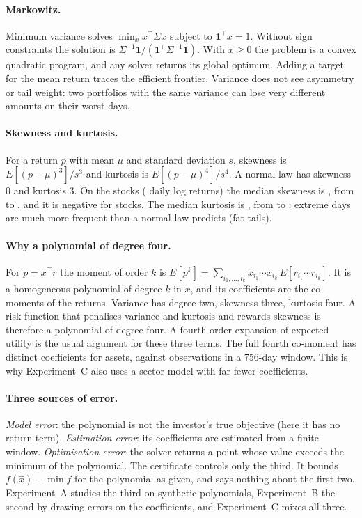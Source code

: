 \documentclass[11pt,a4paper]{article}
\begin{document}
\paragraph{Markowitz.}
Minimum variance solves $\min_x x^\top\Sigma x$ subject to $\mathbf 1^\top x=1$.
Without sign constraints the solution is $\Sigma^{-1}\mathbf 1/(\mathbf 1^\top\Sigma^{-1}\mathbf 1)$.
With $x\ge0$ the problem is a convex quadratic program, and any solver returns its global optimum.
Adding a target for the mean return traces the efficient frontier.
Variance does not see asymmetry or tail weight: two portfolios with the same variance can lose very different amounts on their worst days.

\paragraph{Skewness and kurtosis.}
For a return $p$ with mean $\mu$ and standard deviation $s$, skewness is $E[(p-\mu)^3]/s^3$ and kurtosis is $E[(p-\mu)^4]/s^4$.
A normal law has skewness 0 and kurtosis 3.
On the \uN{} stocks (\uReturns{} daily log returns) the median skewness is \uSkewMed{}, from \uSkewMin{} to \uSkewMax{}, and it is negative for \uSkewNeg{} stocks.
The median kurtosis is \uKurtMed{}, from \uKurtMin{} to \uKurtMax{}: extreme days are much more frequent than a normal law predicts (fat tails).

\paragraph{Why a polynomial of degree four.}
For $p=x^\top r$ the moment of order $k$ is $E[p^k]=\sum_{i_1,\dots,i_k}x_{i_1}\cdots x_{i_k}\,E[r_{i_1}\cdots r_{i_k}]$.
It is a homogeneous polynomial of degree $k$ in $x$, and its coefficients are the co-moments of the returns.
Variance has degree two, skewness three, kurtosis four.
A risk function that penalises variance and kurtosis and rewards skewness is therefore a polynomial of degree four.
A fourth-order expansion of expected utility is the usual argument for these three terms.
The full fourth co-moment has \uCoMom{} distinct coefficients for \uN{} assets, against \uObs{} observations in a 756-day window.
This is why Experiment~C also uses a sector model with far fewer coefficients.

\paragraph{Three sources of error.}
\emph{Model error}: the polynomial is not the investor's true objective (here it has no return term).
\emph{Estimation error}: its coefficients are estimated from a finite window.
\emph{Optimisation error}: the solver returns a point whose value exceeds the minimum of the polynomial.
The certificate controls only the third.
It bounds $f(\hat x)-\min f$ for the polynomial as given, and says nothing about the first two.
Experiment~A studies the third on synthetic polynomials, Experiment~B the second by drawing errors on the coefficients, and Experiment~C mixes all three.
\end{document}
